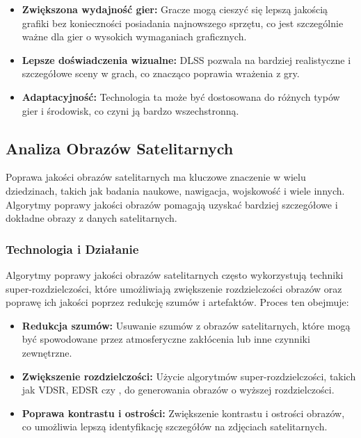 \documentclass[10pt]{article}
\begin{document}
\begin{itemize}
    \item \textbf{Zwiększona wydajność gier:} Gracze mogą cieszyć się lepszą jakością grafiki bez konieczności posiadania najnowszego sprzętu, co jest szczególnie ważne dla gier o wysokich wymaganiach graficznych.
    \item \textbf{Lepsze doświadczenia wizualne:} DLSS pozwala na bardziej realistyczne i szczegółowe sceny w grach, co znacząco poprawia wrażenia z gry.
    \item \textbf{Adaptacyjność:} Technologia ta może być dostosowana do różnych typów gier i środowisk, co czyni ją bardzo wszechstronną.
\end{itemize}

\subsection*{Analiza Obrazów Satelitarnych}

Poprawa jakości obrazów satelitarnych ma kluczowe znaczenie w wielu dziedzinach, takich jak badania naukowe, nawigacja, wojskowość i wiele innych. Algorytmy poprawy jakości obrazów pomagają uzyskać bardziej szczegółowe i dokładne obrazy z danych satelitarnych.

\subsubsection*{Technologia i Działanie}

Algorytmy poprawy jakości obrazów satelitarnych często wykorzystują techniki super-rozdzielczości, które umożliwiają zwiększenie rozdzielczości obrazów oraz poprawę ich jakości poprzez redukcję szumów i artefaktów. Proces ten obejmuje:

\begin{itemize}
    \item \textbf{Redukcja szumów:} Usuwanie szumów z obrazów satelitarnych, które mogą być spowodowane przez atmosferyczne zakłócenia lub inne czynniki zewnętrzne.
    \item \textbf{Zwiększenie rozdzielczości:} Użycie algorytmów super-rozdzielczości, takich jak VDSR, EDSR czy , do generowania obrazów o wyższej rozdzielczości.
    \item \textbf{Poprawa kontrastu i ostrości:} Zwiększenie kontrastu i ostrości obrazów, co umożliwia lepszą identyfikację szczegółów na zdjęciach satelitarnych.
\end{itemize}
\end{document}
